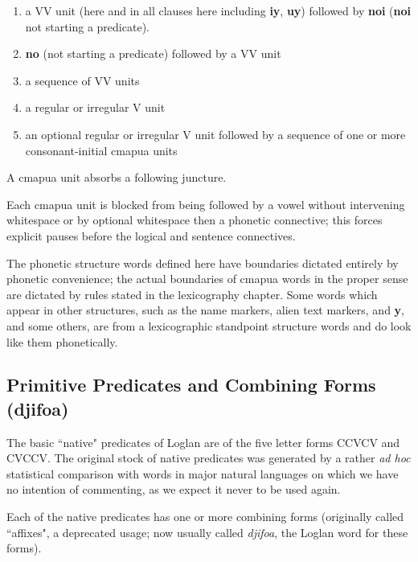 \documentclass[12pt]{book}
\begin{document}
\begin{enumerate}

\item a VV unit (here and in all clauses here including {\bf iy}, {\bf uy}) followed by {\bf noi} ({\bf noi} not starting a predicate).

\item {\bf no} (not starting a predicate) followed by a VV unit

\item a sequence of VV units

\item a regular or irregular V unit

\item an optional regular or irregular V unit followed by a sequence of one or more consonant-initial cmapua units

\end{enumerate}

A cmapua unit absorbs a following juncture.

Each cmapua unit is blocked from being followed by a vowel without intervening whitespace or by optional whitespace then a phonetic connective;  this forces explicit pauses before the logical and sentence connectives.

The phonetic structure words defined here have boundaries dictated entirely by phonetic convenience;  the actual boundaries of cmapua words in the proper sense are dictated by rules stated in the lexicography chapter.  Some words which appear in other structures, such as the name markers, alien text markers, and {\bf y}, and some others, are from a lexicographic standpoint structure words and do look like them phonetically.

\subsection{Primitive Predicates and Combining Forms (djifoa)}

The basic ``native" predicates of Loglan are of the five letter forms CCVCV and CVCCV.  The original stock of native predicates was generated by a rather {\em ad hoc\/} statistical comparison with words in major natural languages on which we have no intention of commenting, as we expect it never to be used again. 

Each of the native predicates has one or more combining forms (originally called ``affixes", a  deprecated usage;  now usually called {\em djifoa\/}, the Loglan word for these forms).
\end{document}
